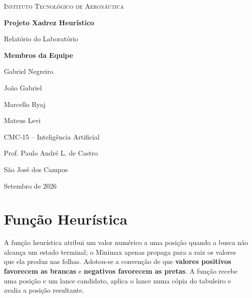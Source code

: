 \documentclass[12pt,a4paper]{article}
\begin{document}
\begin{titlepage}
  \centering
  \vspace*{1.5cm}

  {\Large\textsc{Instituto Tecnológico de Aeronáutica}\par}

  \vspace{4cm}

  {\Huge\bfseries Projeto Xadrez Heurístico\par}
  \vspace{0.5cm}
  {\Large Relatório do Laboratório\par}

  \vspace{4cm}

  {\large\bfseries Membros da Equipe\par}
  \vspace{0.4cm}
  {\large
    Gabriel Negreiro\par
    João Gabriel\par
    Marcello Ryaj\par
    Mateus Levi\par
  }

  \vfill

  {\large CMC-15 -- Inteligência Artificial\par}
  {\large Prof. Paulo André L. de Castro\par}
  \vspace{0.6cm}
  {\large São José dos Campos\par}
  {\large Setembro de 2026\par}
\end{titlepage}

\section{Função Heurística}

A função heurística atribui um valor numérico a uma posição quando a
busca não alcança um estado terminal; o Minimax apenas propaga para a
raiz os valores que ela produz nas folhas. Adotou-se a convenção de que
\textbf{valores positivos favorecem as brancas} e \textbf{negativos
favorecem as pretas}. A função recebe uma posição e um lance candidato,
aplica o lance numa cópia do tabuleiro e avalia a posição resultante.
\end{document}
